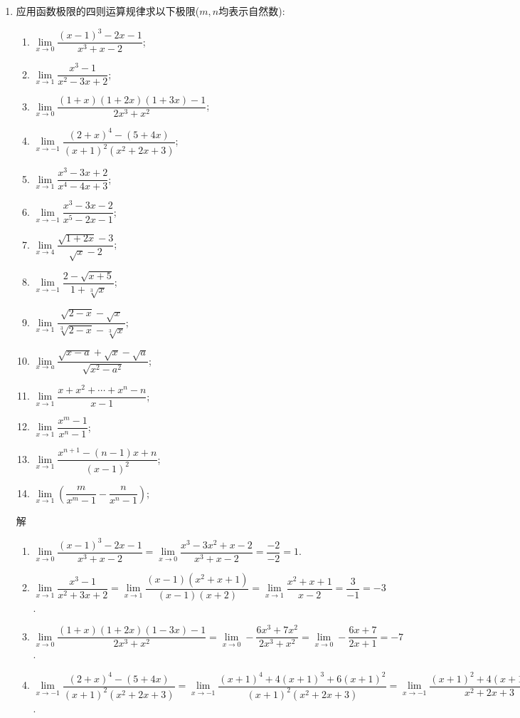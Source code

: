 \documentclass[UTF8,a4paper,20pt]{article}
\begin{document}
\begin{enumerate}[1.]
\item 应用函数极限的四则运算规律求以下极限($m,n$均表示自然数):
	\begin{enumerate}[(1)]
	\item $\lim\limits_{x\to 0} \dfrac{(x-1)^3-2x-1}{x^3+x-2}$;
	\item $\lim\limits_{x\to 1} \dfrac{x^3-1}{x^2-3x+2}$;
	\item $\lim\limits_{x\to 0} \dfrac{(1+x)(1+2x)(1+3x)-1}{2x^3+x^2}$;
	\item $\lim\limits_{x\to -1} \dfrac{(2+x)^4-(5+4x)}{(x+1)^2(x^2+2x+3)}$;
	\item $\lim\limits_{x\to 1} \dfrac{x^3-3x+2}{x^4-4x+3}$;
	\item $\lim\limits_{x\to -1} \dfrac{x^3-3x-2}{x^5-2x-1}$;
	\item $\lim\limits_{x\to 4} \dfrac{\sqrt{1+2x}-3}{\sqrt{x}-2}$;
	\item $\lim\limits_{x\to -1} \dfrac{2-\sqrt{x+5}}{1+\sqrt[3]{x}}$;
	\item $\lim\limits_{x\to 1} \dfrac{\sqrt{2-x}-\sqrt{x}}{\sqrt[3]{2-x}-\sqrt[3]{x}}$;
	\item $\lim\limits_{x\to a} \dfrac{\sqrt{x-a}+\sqrt{x}-\sqrt{a}}{\sqrt{x^2-a^2}}$;
	\item $\lim\limits_{x\to 1} \dfrac{x+x^2+\cdots+x^n-n}{x-1}$;
	\item $\lim\limits_{x\to 1} \dfrac{x^m-1}{x^n-1}$;
	\item $\lim\limits_{x\to 1} \dfrac{x^{n+1}-(n-1)x+n}{(x-1)^2}$;
	\item $\lim\limits_{x\to 1} \left(\dfrac{m}{x^m-1}-\dfrac{n}{x^n-1}\right)$;
	\end{enumerate}
{\heiti 解}
	\begin{enumerate}[(1)]
	\item $\lim\limits_{x\to 0} \dfrac{(x-1)^3-2x-1}{x^3+x-2}=\lim\limits_{x\to 0} \dfrac{x^3-3x^2+x-2}{x^3+x-2}= \dfrac{-2}{-2}=1$.
	\item $\lim\limits_{x\to 1} \dfrac{x^3-1}{x^2+3x+2}=\lim\limits_{x\to 1} \dfrac{(x-1)(x^2+x+1)}{(x-1)(x+2)}=\lim\limits_{x\to 1} \dfrac{x^2+x+1}{x-2}=\dfrac{3}{-1}=-3$.
	\item $\lim\limits_{x\to 0} \dfrac{(1+x)(1+2x)(1-3x)-1}{2x^3+x^2}=\lim\limits_{x\to 0} -\dfrac{6x^3+7x^2}{2x^3+x^2}=\lim\limits_{x\to 0} -\dfrac{6x+7}{2x+1}=-7$.
	\item $\lim\limits_{x\to -1} \dfrac{(2+x)^4-(5+4x)}{(x+1)^2(x^2+2x+3)}=\lim\limits_{x\to -1} \dfrac{(x+1)^4+4(x+1)^3+6(x+1)^2}{(x+1)^2(x^2+2x+3)}=\lim\limits_{x\to-1} \dfrac{(x+1)^2+4(x+1)+6}{x^2+2x+3}= \dfrac{6}{2}=3$.

\end{enumerate}
\end{enumerate}
\end{document}

